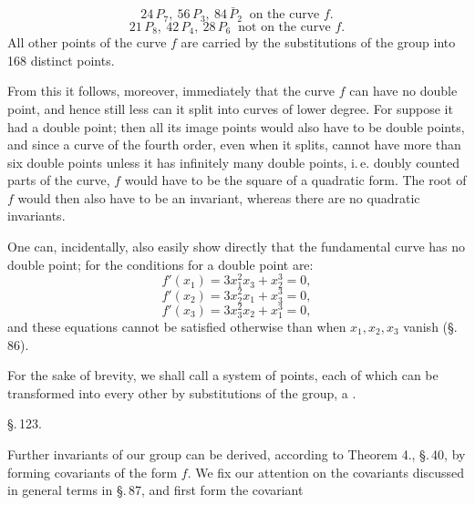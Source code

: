 \[
24\,P_7,\ 56\,P_3,\ 84\,\bar P_2 \ \text{ on the curve } f.
\]
\[
21\,P_8,\ 42\,P_4,\ 28\,P_6 \ \text{ not on the curve } f.
\]
All other points of the curve $f$ are carried by the substitutions of
the group into 168 distinct points.

From this it follows, moreover, immediately that the curve $f$ can
have no double point, and hence still less can it split into curves of
lower degree. For suppose it had a double point; then all its image
points would also have to be double points, and since a curve of the
fourth order, even when it splits, cannot have more than six double
points unless it has infinitely many double points, i.\,e. doubly
counted parts of the curve, $f$ would have to be the square of a
quadratic form. The root of $f$ would then also have to be an
invariant, whereas there are no quadratic invariants.

One can, incidentally, also easily show directly that the fundamental
curve has no double point; for the conditions for a double point
are:
\[
f'(x_1) = 3x_1^2x_3 + x_2^3 = 0,
\]
\[
f'(x_2) = 3x_2^2x_1 + x_3^3 = 0,
\]
\[
f'(x_3) = 3x_3^2x_2 + x_1^3 = 0,
\]
and these equations cannot be satisfied otherwise than when
$x_1, x_2, x_3$ vanish (\S.\,86).

For the sake of brevity, we shall call a system of points, each of
which can be transformed into every other by substitutions of the
group, a .

\S.\,123.


Further invariants of our group can be derived, according to Theorem 4.,
\S.\,40, by forming covariants of the form $f$. We fix our attention
on the covariants discussed in general terms in \S.\,87, and first form
the  covariant

